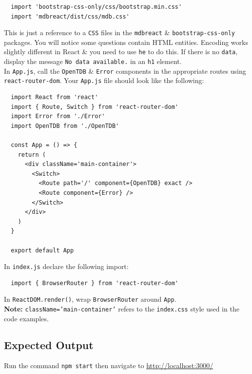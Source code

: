 \documentclass{article}
\begin{document}
\begin{verbatim}
  import 'bootstrap-css-only/css/bootstrap.min.css'
  import 'mdbreact/dist/css/mdb.css'
\end{verbatim}

This is just a reference to a \texttt{CSS} files in the \texttt{mdbreact} \& \texttt{bootstrap-css-only} packages. You will notice some questions contain HTML entities. Encoding works slightly different in React \& you need to use \texttt{he} to do this. If there is no \texttt{data}, display the message \texttt{No data available.} in an \texttt{h1} element. \\

In \texttt{App.js}, call the \texttt{OpenTDB} \& \texttt{Error} components in the appropriate routes using \texttt{react-router-dom}. Your \texttt{App.js} file should look like the following:

\begin{verbatim}
  import React from 'react'
  import { Route, Switch } from 'react-router-dom'
  import Error from './Error'
  import OpenTDB from './OpenTDB'
  
  const App = () => {
    return (
      <div className='main-container'>
        <Switch>
          <Route path='/' component={OpenTDB} exact />
          <Route component={Error} />
        </Switch>
      </div>
    )
  }
  
  export default App  
\end{verbatim}

In \texttt{index.js} declare the following import:

\begin{verbatim}
  import { BrowserRouter } from 'react-router-dom'
\end{verbatim}

In \texttt{ReactDOM.render()}, wrap \texttt{BrowserRouter} around \texttt{App}. \\

\textbf{Note:} \texttt{className='main-container'} refers to the \texttt{index.css} style used in the code examples.

\subsection*{Expected Output} 
Run the command \texttt{npm start} then navigate to \href{http://localhost:3000/}{http://localhost:3000/} \\
\end{document}
